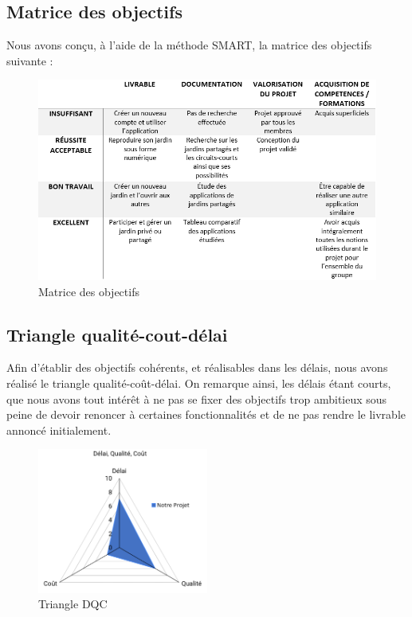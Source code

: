 \documentclass[french,a4paper]{article}
\begin{document}
\subsection{Matrice des objectifs}
Nous avons conçu, à l'aide de la méthode SMART, la matrice des objectifs suivante :

\begin{figure}[H]
    \centering
    \includegraphics[width=1\textwidth]{img/matrice_des_objectifs.png}
    \caption{Matrice des objectifs}
\end{figure}

\subsection{Triangle qualité-cout-délai}
Afin d’établir des objectifs cohérents, et réalisables dans les délais, nous avons réalisé le triangle qualité-coût-délai. On remarque ainsi, les délais étant courts, que nous avons tout intérêt à ne pas se fixer des objectifs trop ambitieux sous peine de devoir renoncer à certaines fonctionnalités et de ne pas rendre le livrable annoncé initialement.

\begin{figure}[H]
    \centering
    \includegraphics[width=0.5\textwidth]{img/triangle_QCD.png}
    \caption{Triangle DQC}
\end{figure}
\end{document}
